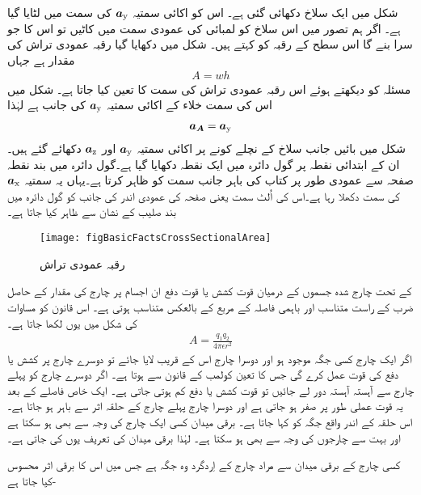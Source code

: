 شکل   میں ایک سلاخ دکھائی گئی ہے۔ اس کو اکائی سمتیہ ${\boldsymbol{a}}_{\textup{y}}$ کی سمت میں لٹایا گیا ہے۔ اگر ہم تصور میں اس سلاخ کو لمبائی کی عمودی سمت میں کاٹیں تو اس کا جو سرا بنے گا اس سطح کے رقبہ کو  کہتے ہیں۔ شکل میں دکھایا گیا رقبہ عمودی تراش  کی مقدار  ہے جہاں
\begin{align}
A=wh
\end{align}
مسئلہ کو دیکھتے ہوئے اس رقبہ عمودی تراش کی سمت کا تعین کیا جاتا ہے۔ شکل میں اس کی سمت   خلاء کے اکائی سمتیہ  ${\boldsymbol{a}}_{\textup{y}}$ کی جانب ہے لہٰذا
\begin{align}
{\ensuremath{{\boldsymbol{a_A}}}}={\boldsymbol{a}}_{\textup{y}}
\end{align}
شکل میں بائیں جانب سلاخ کے نچلے کونے پر اکائی سمتیہ  ${\boldsymbol{a}}_{\textup{y}}$  اور  ${\boldsymbol{a}}_{\textup{z}}$ دکھائے گئے ہیں۔ان کے ابتدائی نقطہ پر گول دائرہ میں ایک نقطہ دکھایا گیا ہے۔گول دائرہ میں بند نقطہ صفحہ سے عمودی طور پر کتاب کی باہر جانب سمت کو ظاہر کرتا ہے۔یہاں یہ سمتیہ  ${\boldsymbol{a}}_{\textup{x}}$ کی سمت دکھلا رہا ہے۔اس کی اُلٹ سمت یعنی صفحہ کی عمودی اندر کی جانب کو گول دائرہ میں بند صلیب کے نشان سے ظاہر کیا جاتا ہے۔
%
\begin{figure}
\centering
\texttt{[image: figBasicFactsCrossSectionalArea]}
\caption{رقبہ  عمودی تراش}
\label{شکل_حقائق_رقبہ_عمودی}
\end{figure}
%
 کے تحت چارج شدہ جسموں کے درمیان قوت کشش یا قوت دفع ان اجسام پر چارج کی مقدار کے حاصل ضرب کے راست متناسب اور باہمی فاصلہ کے مربع کے بالعکس متناسب ہوتی ہے۔ اس قانون کو مساوات کی شکل میں یوں لکھا جاتا ہے۔
\begin{align}
A=\frac{q_1 q_2}{4 \pi \epsilon r^2}
\end{align}
	اگر ایک چارج کسی جگہ موجود ہو اور دوسرا چارج اس کے قریب لایا جائے تو دوسرے چارج پر کشش یا دفع کی قوت عمل کرے گی جس کا تعین کولمب کے قانون سے ہوتا ہے۔ اگر دوسرے چارج کو پہلے چارج سے آہستہ آہستہ دور لے جائیں تو قوت کشش یا دفع کم ہوتی جاتی ہے۔ ایک خاص فاصلے کے بعد یہ قوت عملی طور پر صفر ہو جاتی ہے اور دوسرا چارج پہلے چارج کے حلقہ اثر سے باہر ہو جاتا ہے۔ اس حلقہ کے اندر واقع جگہ کو  کہا جاتا ہے۔ برقی میدان کسی ایک چارج کی وجہ سے بھی ہو سکتا ہے اور بہت سے چارجوں کی وجہ سے بھی ہو سکتا ہے۔ لہٰذا برقی میدان کی تعریف یوں کی جاتی ہے۔

 کسی چارج کے برقی میدان سے مراد چارج کے اِردگرد وہ جگہ ہے جس میں اس کا برقی اثر محسوس کیا جاتا ہے-

